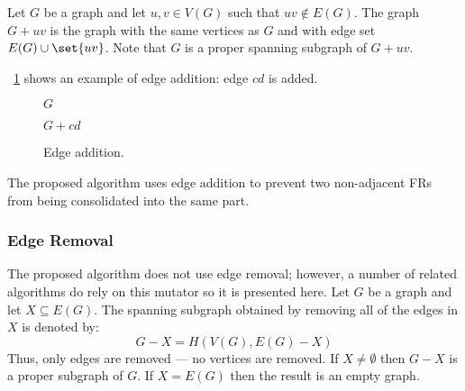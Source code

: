 Let \(G\) be a graph and let \(u,v\in V(G)\) such that \(uv\notin E(G)\).  The graph \(G+uv\) is the graph with the
same vertices as \(G\) and with edge set \(E(G)\cup\set{uv}\).  Note that \(G\) is a proper spanning subgraph of
\(G+uv\).

\figurename~\ref{fig:eadd} shows an example of edge addition: edge \(cd\) is added.

\begin{figure}[H]
  \begin{minipage}{2.75in}
    \centering

    \bigskip

    \(G\)
  \end{minipage}
  \begin{minipage}{2.75in}
    \centering

    \bigskip

    \(G+cd\)
  \end{minipage}
  \caption{Edge addition.}
  \label{fig:eadd}
\end{figure}

The proposed algorithm uses edge addition to prevent two non-adjacent FRs from being consolidated into the same
part.

\subsubsection{Edge Removal}\label{sec:sub:sub:eremove}

The proposed algorithm does not use edge removal; however, a number of related algorithms do rely on this mutator
so it is presented here.  Let \(G\) be a graph and let \(X\subseteq E(G)\).  The spanning subgraph obtained by
removing all of the edges in \(X\) is denoted by:
\[G-X=H\left(V(G),E(G)-X\right)\]
Thus, only edges are removed --- no vertices are removed.  If \(X\ne\emptyset\) then \(G-X\) is a proper subgraph of
\(G\).  If \(X=E(G)\) then the result is an empty graph.


